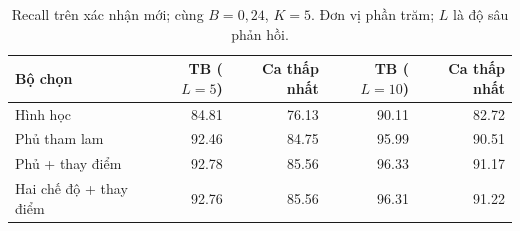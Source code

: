 \begin{table}[htbp]
\centering\footnotesize
\caption{Recall trên xác nhận mới; cùng $B=0{,}24$, $K=5$. Đơn vị phần trăm; $L$ là độ sâu phản hồi.}
\label{tab:fresh-utility}
\begin{tabular}{lrrrr}
\toprule
Bộ chọn & TB ($L=5$) & Ca thấp nhất & TB ($L=10$) & Ca thấp nhất \\
\midrule
Hình học & 84.81 & 76.13 & 90.11 & 82.72 \\
Phủ tham lam & 92.46 & 84.75 & 95.99 & 90.51 \\
Phủ + thay điểm & 92.78 & 85.56 & 96.33 & 91.17 \\
Hai chế độ + thay điểm & 92.76 & 85.56 & 96.31 & 91.22 \\
\bottomrule
\end{tabular}
\end{table}
